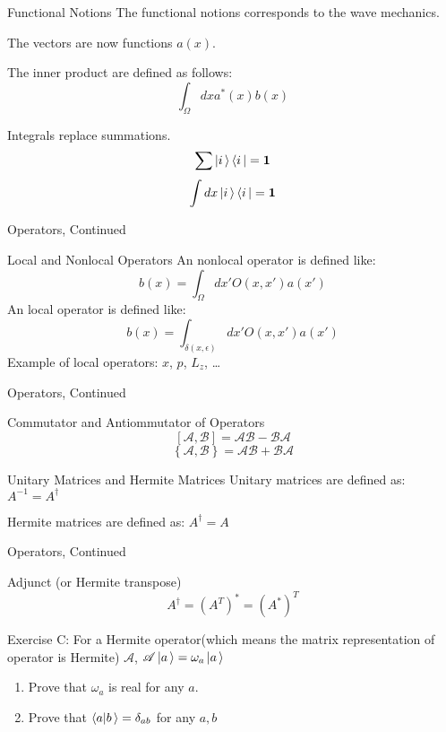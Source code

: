 \documentclass[aspectratio=169,10pt,compress,t]{ctexbeamer}
\begin{document}
\begin{frame}{Functional Notions}
The functional notions corresponds to the wave mechanics.

The vectors are now functions $a(x)$.

The inner product are defined as follows:
$$\int_\Omega dx a^*(x) b(x)$$

Integrals replace summations.
$$\sum \ket{i\,} \bra{i\,} = \mathbf{1}$$
$$\int dx \ket{i\,} \bra{i\,} = \mathbf{1}$$
\end{frame}

\begin{frame}{Operators, Continued}
\begin{block}{Local and Nonlocal Operators}
  An nonlocal operator is defined like:
  $$b(x) = \int_\Omega dx' O(x, x') a(x')$$
  An local operator is defined like:
  $$b(x) = \int_{\delta(x, \epsilon)} dx' O(x, x') a(x')$$
  Example of local operators: $x$, $p$, $L_z$, \dots
\end{block}  
\end{frame}

\begin{frame}{Operators, Continued}
\begin{block}{Commutator and Antiommutator of Operators}
  $$\left[ \mathscr{A}, \mathscr{B} \right] = \mathscr{A} \mathscr{B} - \mathscr{B} \mathscr{A}$$
  $$\left\{ \mathscr{A}, \mathscr{B} \right\} = \mathscr{A} \mathscr{B} + \mathscr{B} \mathscr{A}$$
\end{block}  

\begin{block}{Unitary Matrices and Hermite Matrices}
  Unitary matrices are defined as:
  $A^{-1} = A^{\dagger}$
  
  Hermite matrices are defined as:
  $A^{\dagger} = A$
\end{block}  
\end{frame}

\begin{frame}{Operators, Continued}
\begin{block}{Adjunct (or Hermite transpose)}
  $$A^{\dagger} = (A^T)^* = (A^*)^T$$
\end{block}  

Exercise C: For a Hermite operator(which means the matrix representation of operator is Hermite) $\mathscr{A}$, $\mathscr{A}\ket{a\,} = \omega_a \ket{a\,}$
\begin{enumerate}
  \item Prove that $\omega_a$ is real for any $a$.
  \item Prove that $\braket{a|b\,} = \delta_{ab}$ for any $a, b$
\end{enumerate}

\end{frame}
\end{document}
